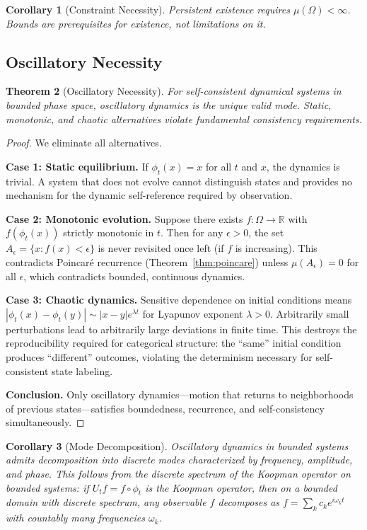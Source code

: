 \documentclass[11pt,twocolumn,a4paper]{article}
\newtheorem{theorem}{Theorem}[section]
\newtheorem{corollary}[theorem]{Corollary}
\theoremstyle{definition}
\theoremstyle{remark}
\newcommand{\Real}{\mathbb{R}}
\begin{document}
\begin{corollary}[Constraint Necessity]
Persistent existence requires $\mu(\Omega) < \infty$. Bounds are prerequisites for existence, not limitations on it.
\end{corollary}

\subsection{Oscillatory Necessity}

\begin{theorem}[Oscillatory Necessity]
\label{thm:oscillatory}
For self-consistent dynamical systems in bounded phase space, oscillatory dynamics is the unique valid mode. Static, monotonic, and chaotic alternatives violate fundamental consistency requirements.
\end{theorem}

\begin{proof}
We eliminate all alternatives.

\textbf{Case 1: Static equilibrium.} If $\phi_t(x) = x$ for all $t$ and $x$, the dynamics is trivial. A system that does not evolve cannot distinguish states and provides no mechanism for the dynamic self-reference required by observation.

\textbf{Case 2: Monotonic evolution.} Suppose there exists $f: \Omega \to \Real$ with $f(\phi_t(x))$ strictly monotonic in $t$. Then for any $\epsilon > 0$, the set $A_\epsilon = \{x : f(x) < \epsilon\}$ is never revisited once left (if $f$ is increasing). This contradicts Poincar\'e recurrence (Theorem~\ref{thm:poincare}) unless $\mu(A_\epsilon) = 0$ for all $\epsilon$, which contradicts bounded, continuous dynamics.

\textbf{Case 3: Chaotic dynamics.} Sensitive dependence on initial conditions means $|\phi_t(x) - \phi_t(y)| \sim |x - y| e^{\lambda t}$ for Lyapunov exponent $\lambda > 0$. Arbitrarily small perturbations lead to arbitrarily large deviations in finite time. This destroys the reproducibility required for categorical structure: the ``same'' initial condition produces ``different'' outcomes, violating the determinism necessary for self-consistent state labeling.

\textbf{Conclusion.} Only oscillatory dynamics---motion that returns to neighborhoods of previous states---satisfies boundedness, recurrence, and self-consistency simultaneously.
\end{proof}

\begin{corollary}[Mode Decomposition]
\label{cor:modes}
Oscillatory dynamics in bounded systems admits decomposition into discrete modes characterized by frequency, amplitude, and phase. This follows from the discrete spectrum of the Koopman operator \citep{koopman1931} on bounded systems: if $U_t f = f \circ \phi_t$ is the Koopman operator, then on a bounded domain with discrete spectrum, any observable $f$ decomposes as $f = \sum_k c_k e^{i\omega_k t}$ with countably many frequencies $\omega_k$.
\end{corollary}
\end{document}
